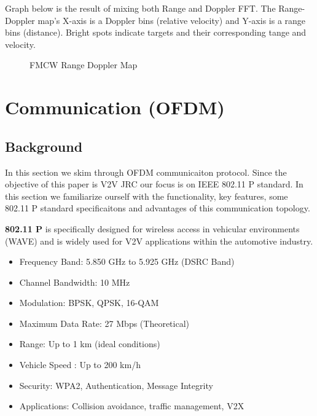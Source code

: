 \documentclass[conference]{IEEEtran}
\begin{document}
Graph below is the result of mixing both Range and Doppler FFT. The Range-Doppler map's X-axis is a Doppler bins (relative velocity) and Y-axis is a range bins (distance). Bright spots indicate targets and their corresponding tange and velocity.
	\begin{figure}[H]
	    		\centering
	    		\caption{FMCW Range Doppler Map}
		\end{figure}
		
		
     \section {Communication (OFDM)}
     
	 \subsection {Background}
 
 
            In this section we skim through OFDM communicaiton protocol. Since the objective of this paper is V2V JRC our focus is on IEEE 802.11 P standard. In this section we familiarize ourself with the functionality, key features, some 802.11 P standard specificaitons and advantages of this communication topology.\par
    \textbf{  802.11 P} is specifically designed for wireless access in vehicular environments (WAVE) and is widely used for V2V applications within the automotive industry.
      
      \begin{itemize}
      \item Frequency Band:		5.850 GHz to 5.925 GHz (DSRC Band)
	\item Channel Bandwidth:	10 MHz
	\item Modulation:		BPSK, QPSK, 16-QAM
	\item Maximum Data Rate:	27 Mbps (Theoretical)
	\item Range: 			Up to 1 km (ideal conditions)
	\item Vehicle Speed :                Up to 200 km/h
	\item Security:			WPA2, Authentication, Message Integrity
	\item Applications:		Collision avoidance, traffic management, V2X
	\end{itemize}
	
\end{document}
